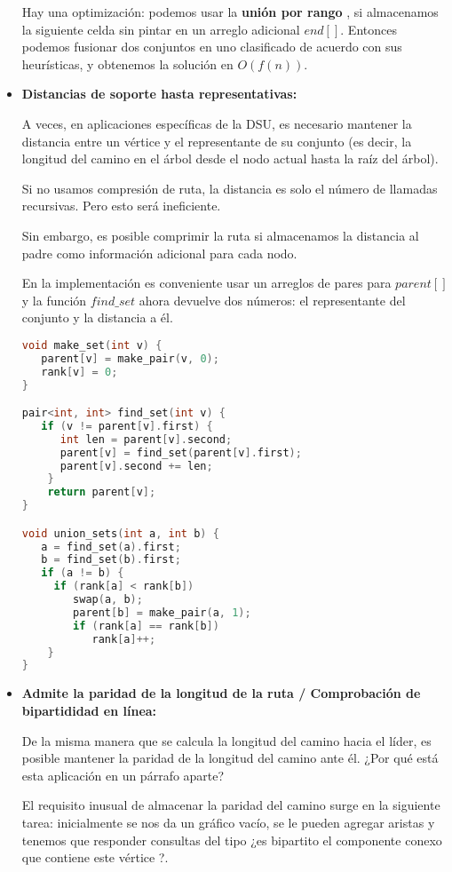 \begin{itemize}
	 
	 Hay una optimización: podemos usar la \textbf{unión por rango} , si almacenamos la siguiente celda sin pintar en un arreglo adicional $end[]$. Entonces podemos fusionar dos conjuntos en uno clasificado de acuerdo con sus heurísticas, y obtenemos la solución en $O(f(n))$.
	 
	 \item \textbf{Distancias de soporte hasta representativas:}
	 
	 A veces, en aplicaciones específicas de la DSU, es necesario mantener la distancia entre un vértice y el representante de su conjunto (es decir, la longitud del camino en el árbol desde el nodo actual hasta la raíz del árbol).
	 
	 Si no usamos compresión de ruta, la distancia es solo el número de llamadas recursivas. Pero esto será ineficiente.
	 
	 Sin embargo, es posible comprimir la ruta si almacenamos la distancia al padre como información adicional para cada nodo.
	 
	 En la implementación es conveniente usar un arreglos de pares para $parent[]$ y la función $find\_set$ ahora devuelve dos números: el representante del conjunto y la distancia a él.
	 
	 \begin{lstlisting}[language=C++]
void make_set(int v) {
   parent[v] = make_pair(v, 0);
   rank[v] = 0;
}

pair<int, int> find_set(int v) {
   if (v != parent[v].first) {
      int len = parent[v].second;
      parent[v] = find_set(parent[v].first);
      parent[v].second += len;
	}
    return parent[v];
}

void union_sets(int a, int b) {
   a = find_set(a).first;
   b = find_set(b).first;
   if (a != b) {
     if (rank[a] < rank[b])
        swap(a, b);
        parent[b] = make_pair(a, 1);
        if (rank[a] == rank[b])
           rank[a]++;
	}
}
\end{lstlisting}
	 
	 \item \textbf{Admite la paridad de la longitud de la ruta / Comprobación de bipartididad en línea:}
	 
	 De la misma manera que se calcula la longitud del camino hacia el líder, es posible mantener la paridad de la longitud del camino ante él. ¿Por qué está esta aplicación en un párrafo aparte?
	 
	 El requisito inusual de almacenar la paridad del camino surge en la siguiente tarea: inicialmente se nos da un gráfico vacío, se le pueden agregar aristas y tenemos que responder consultas del tipo ¿es bipartito el componente conexo que contiene este vértice ?.
	 

\end{itemize}
